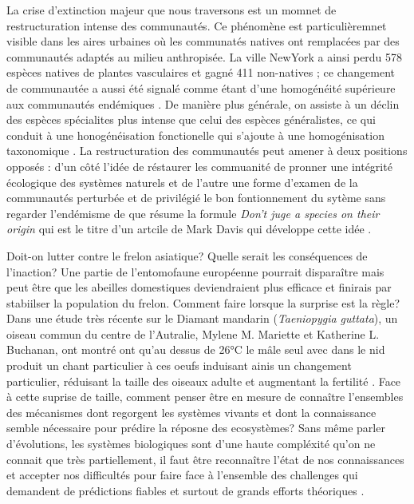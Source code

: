 La crise d'extinction majeur que nous traversons \citep{Thomas2004} est
un momnet de restructuration intense des communautés. Ce phénomène est
particulièremnet visible dans les aires urbaines où les communatés
natives ont remplacées par des communautés adaptés au milieu
anthropisée. La ville NewYork a ainsi perdu 578 espèces natives de
plantes vasculaires et gagné 411 non-natives \citep{McKinney2006}; ce
changement de communautée a aussi été signalé comme étant d'une
homogénéité supérieure aux communautés endémiques \citep{McKinney2006}.
De manière plus générale, on assiste à un déclin des espèces spécialites
plus intense que celui des espèces généralistes, ce qui conduit à une
honogénéisation fonctionelle qui s'ajoute à une homogénisation
taxonomique \citep{Clavel2011}. La restructuration des communautés peut
amener à deux positions opposés : d'un côté l'idée de réstaurer les
commuanité de pronner une intégrité écologique des systèmes naturels
\citep{Suding2015} et de l'autre une forme d'examen de la communautés
perturbée et de privilégié le bon fontionnement du sytème sans regarder
l'endémisme de que résume la formule \emph{Don't juge a species on their
origin} qui est le titre d'un artcile de Mark Davis qui développe cette
idée \citep{Davis2011}.

Doit-on lutter contre le frelon asiatique? Quelle serait les
conséquences de l'inaction? Une partie de l'entomofaune européenne
pourrait disparaître mais peut être que les abeilles domestiques
deviendraient plus efficace et finirais par stabiilser la population du
frelon. Comment faire lorsque la surprise est la règle? Dans une étude
très récente sur le Diamant mandarin (\emph{Taeniopygia guttata}), un
oiseau commun du centre de l'Autralie, Mylene M. Mariette et Katherine
L. Buchanan, ont montré ont qu'au dessus de 26°C le mâle seul avec dans
le nid produit un chant particulier à ces oeufs induisant ainis un
changement particulier, réduisant la taille des oiseaux adulte et
augmentant la fertilité \citep{Mariette2016}. Face à cette suprise de
taille, comment penser être en mesure de connaître l'ensembles des
mécanismes dont regorgent les systèmes vivants et dont la connaissance
semble nécessaire pour prédire la réposne des ecosystèmes? Sans même
parler d'évolutions, les systèmes biologiques sont d'une haute
compléxité qu'on ne connait que très partiellement, il faut être
reconnaître l'état de nos connaissances et accepter nos difficultés pour
faire face à l'ensemble des challenges qui demandent de prédictions
fiables et surtout de grands efforts théoriques \citep{Mouquet2015}.

